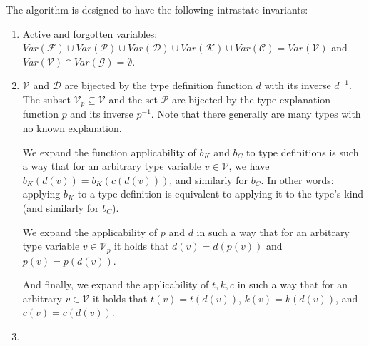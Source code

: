 \begin{defn}
    The algorithm is designed to have the following intrastate invariants:


    \begin{enumerate}
        \item Active and forgotten variables: $Var(\mathcal{F}) \cup Var(\mathcal{P}) \cup Var(\mathcal{D}) \cup Var(\mathcal{K}) \cup Var(\mathcal{C}) = Var(\mathcal{V})$ and $Var(\mathcal{V}) \cap Var(\mathcal{G}) = \emptyset$. \label{invVar}

        \item $\mathcal{V}$ and $\mathcal{D}$ are bijected by the type definition function $d$ with its inverse $d^{-1}$. The subset $\mathcal{V}_p \subseteq \mathcal{V}$ and the set $\mathcal{P}$ are bijected by the type explanation function $p$ and its inverse $p^{-1}$. Note that there generally are many types with no known explanation. \label{invPD}

        We expand the function applicability of $b_K$ and $b_C$ to type definitions is such a way that for an arbitrary type variable $v \in \mathcal{V}$, we have $b_K (d (v)) = b_K (c (d (v)))$, and similarly for $b_C$. In other words: applying $b_K$ to a type definition is equivalent to applying it to the type's kind (and similarly for $b_C$).

        We expand the applicability of $p$ and $d$ in such a way that for an arbitrary type variable $v \in \mathcal{V}_p$ it holds that $d(v) = d(p(v))$ and $p(v) = p(d(v))$.

        And finally, we expand the applicability of $t, k, c$ in such a way that for an arbitrary $v \in \mathcal{V}$ it holds that $t (v) = t (d (v))$, $k (v) = k (d (v))$, and $c (v) = c (d (v))$.

        \item 


\end{enumerate}
\end{defn}
